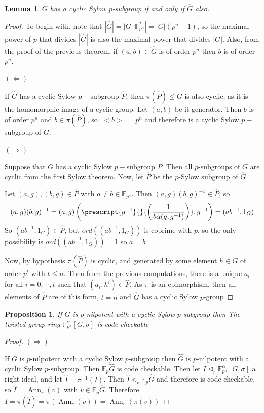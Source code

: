 \documentclass{article}
\newtheorem{lemma}[theorem]{Lemma}
\newtheorem{proposition}[theorem]{Proposition}
\begin{document}
\begin{lemma}
$G$ has a cyclic Sylow $p$-subgroup if and only if $\hat{G}$ also. 
\end{lemma}
\begin{proof}
To begin with, note that $|\hat{G}| = | G | |\mathbb{F}_{p^n}^*| = |G| (p^n-1)$, so the maximal power of $p$ that divides $|\hat{G}|$ is also the maximal power that divides $|G|$. Also, from the proof of the previous theorem, if $(a,b)\in \hat{G}$ is of order $p^n$ then $b$ is of order $p^n$.  

$(\Longleftarrow)$

If $\hat{G}$ has a cyclic Sylow $p-$subgroup $\hat{P}$, then $\pi(\hat{P})\leq G$ is also cyclic, as it is the homomorphic image of a cyclic group. Let $(a,b)$ be it generator. Then $b$ is of order $p^n$ and $b\in \pi(\hat{P})$, so $|<b>|=p^n$ and therefore is a cyclic  Sylow $p-$subgroup of $G$.

$(\Longrightarrow)$

Suppose that $G$ has a cyclic Sylow $p-$subgroup $P$. Then all $p$-subgroups of $G$ are cyclic from the first Sylow theorem. Now, let $\hat{P}$ be the $p$-Sylow subgroup of $\hat{G}$. 

Let $(a,g),(b,g) \in \hat{P}$ with $a\not = b \in \mathbb{F}_{p^n}$. Then $(a,g) (b,g)^{-1} \in \hat{P}$, so
\[
(a,g) (b,g)^{-1} = (a,g) \left( \prescript{g^{-1}}{}{\left(\frac{1}{b\alpha(g,g^{-1})}\right)}, g^{-1} \right) = (ab^{-1},1_G) 
\]
So $(ab^{-1},1_G) \in \hat{P}$, but $ord((ab^{-1},1_G))$ is coprime with $p$, so the only possibility is $ord((ab^{-1},1_G))=1$ so $a=b$

Now, by hypothesis $\pi(\hat{P})$ is cyclic, and generated by some element $h\in G$ of order $p^t$ with $t\leq n$. Then from the previous computations, there is a unique $a_{i}$ for all $i=0,\cdots, t$  such that $(a_i,h^i)\in \hat{P}$. As $\pi$ is an epimorphism, then all elements of $\hat{P}$ are of this form, $t=n$ and $\hat{G}$ has a cyclic Sylow $p$-group
\end{proof}


\begin{proposition}
    If $G$ is $p$-nilpotent with a cyclic Sylow $p$-subgroup then The twisted group ring $\mathbb{F}_{p^n}^\alpha[G,\sigma]$ is code checkable 
\end{proposition}
\begin{proof}
    $(\Longrightarrow)$

    If $G$ is $p$-nilpotent with a cyclic Sylow $p$-subgroup then $\hat{G}$ is  $p$-nilpotent with a cyclic Sylow $p$-subgroup. Then $\mathbb{F}_p\hat{G}$ is code checkable. Then let $I\trianglelefteq_r \mathbb{F}_{p^n}^\alpha[G,\sigma]$ a right ideal, and let $\hat{I} = \pi^{-1}( I)$. Then $\hat{I}\trianglelefteq_r \mathbb{F}_p \hat{G}$ and therefore is code checkable, so $\hat{I} = \operatorname{Ann}_r(v)$ with $v\in \mathbb{F}_p \hat{G}$. Therefore $I=\pi(\hat{I}) = \pi(\operatorname{Ann}_r(v)) = \operatorname{Ann}_r(\pi(v))$
\end{proof}
\end{document}
